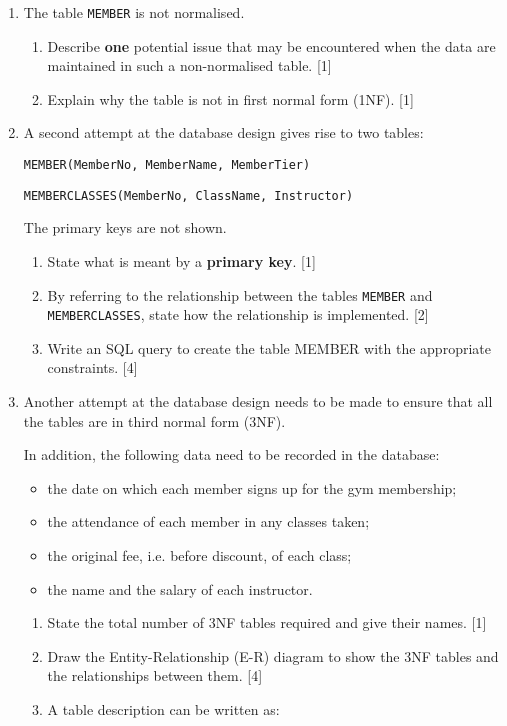 \begin{enumerate}
\item The table \texttt{MEMBER} is not normalised.
\begin{enumerate}
\item Describe \textbf{one} potential issue that may be encountered when
the data are maintained in such a non-normalised table. \hfill{}{[}1{]}
\item Explain why the table is not in first normal form (1NF). \hfill{}{[}1{]}
\end{enumerate}
\item A second attempt at the database design gives rise to two tables:

\texttt{MEMBER(MemberNo, MemberName, MemberTier)}

\texttt{MEMBERCLASSES(MemberNo, ClassName, Instructor)}

The primary keys are not shown. 
\begin{enumerate}
\item State what is meant by a \textbf{primary key}. \hfill{}{[}1{]}
\item By referring to the relationship between the tables \texttt{MEMBER}
and \texttt{MEMBERCLASSES}, state how the relationship is implemented.\hfill{}
{[}2{]}
\item Write an SQL query to create the table MEMBER with the appropriate
constraints.\hfill{} {[}4{]}
\end{enumerate}
\item Another attempt at the database design needs to be made to ensure
that all the tables are in third normal form (3NF). 

In addition, the following data need to be recorded in the database:
\begin{itemize}
\item the date on which each member signs up for the gym membership; 
\item the attendance of each member in any classes taken;
\item the original fee, i.e. before discount, of each class; 
\item the name and the salary of each instructor. 
\end{itemize}
\begin{enumerate}
\item State the total number of 3NF tables required and give their names.
\hfill{}{[}1{]}
\item Draw the Entity-Relationship (E-R) diagram to show the 3NF tables
and the relationships between them. \hfill{}{[}4{]}
\item A table description can be written as:


\end{enumerate}
\end{enumerate}
